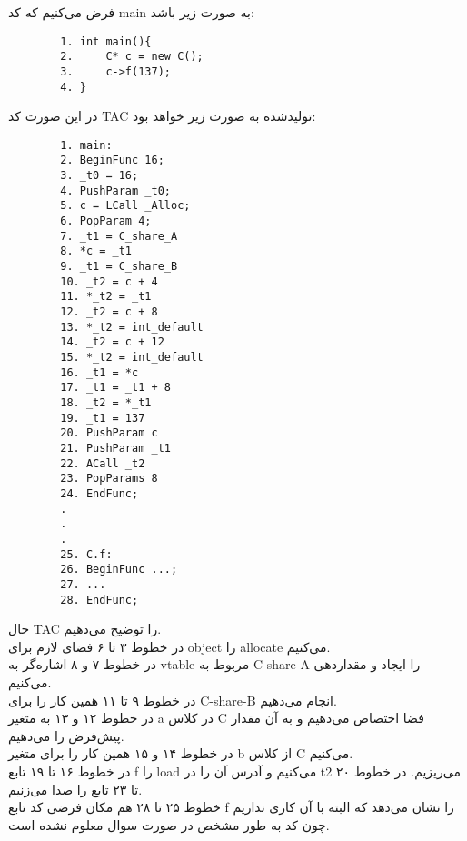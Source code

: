 فرض می‌کنیم که کد main به صورت زیر باشد:
\begin{latin}
	\begin{verbatim}
		1. int main(){
		2.     C* c = new C();
		3.     c->f(137);
		4. }
	\end{verbatim}
\end{latin}
در این صورت کد TAC تولیدشده به صورت زیر خواهد بود:
\begin{latin}
	\begin{verbatim}
		1. main:
		2. BeginFunc 16;
		3. _t0 = 16;
		4. PushParam _t0;
		5. c = LCall _Alloc;
		6. PopParam 4;
		7. _t1 = C_share_A
		8. *c = _t1
		9. _t1 = C_share_B
		10. _t2 = c + 4
		11. *_t2 = _t1
		12. _t2 = c + 8
		13. *_t2 = int_default
		14. _t2 = c + 12
		15. *_t2 = int_default
		16. _t1 = *c
		17. _t1 = _t1 + 8
		18. _t2 = *_t1
		19. _t1 = 137
		20. PushParam c
		21. PushParam _t1
		22. ACall _t2
		23. PopParams 8
		24. EndFunc;
		.
		.
		.
		25. C.f:
		26. BeginFunc ...;
		27. ...
		28. EndFunc;
	\end{verbatim}
\end{latin}
حال TAC را توضیح می‌دهیم.
\\
در خطوط ۳ تا ۶ فضای لازم برای object را allocate می‌کنیم.
\\
در خطوط ۷ و ۸ اشاره‌گر به vtable مربوط به C-share-A را ایجاد و مقداردهی می‌کنیم.
\\
در خطوط ۹ تا ۱۱ همین کار را برای C-share-B انجام می‌دهیم.
\\
در خطوط ۱۲ و ۱۳ به متغیر a در کلاس C فضا اختصاص می‌دهیم و به آن مقدار پیش‌فرض را می‌دهیم.
\\
در خطوط ۱۴ و ۱۵ همین کار را برای متغیر b از کلاس C می‌کنیم.
\\
در خطوط ۱۶ تا ۱۹ تابع f را load می‌کنیم و آدرس آن را در t2 می‌ریزیم. در خطوط ۲۰ تا ۲۳ تابع را صدا می‌زنیم.
\\
خطوط ۲۵ تا ۲۸ هم مکان فرضی کد تابع f را نشان می‌دهد که البته با آن کاری نداریم چون کد به طور مشخص در صورت سوال معلوم نشده است.





